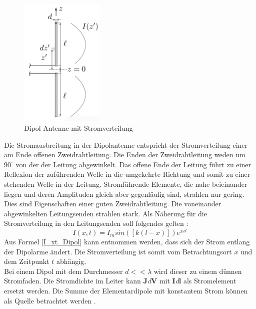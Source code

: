 \begin{figure}[!ht]
	\centering
	\includegraphics[width=4cm]{content/bilder/Dipol_EMANT_S42.pdf}%
	\caption{Dipol Antenne mit Stromverteilung \cite{Tekom}}
	\label{FitzDipol}
\end{figure}
Die Stromausbreitung in der Dipolantenne entspricht der Stromverteilung einer am Ende offenen Zweidrahtleitung. Die Enden der Zweidrahtleitung weden um $90^\circ$  von der der Leitung abgewinkelt. Das offene Ende der Leitung führt zu einer Reflexion der zuführenden Welle in die umgekehrte Richtung und somit zu einer stehenden Welle in der Leitung. Stromführende Elemente, die nahe beieinander liegen und deren Amplituden gleich aber gegenläufig sind, strahlen nur gering. Dies sind Eigenschaften einer guten Zweidrahtleitung. Die voneinander abgewinkelten Leitungsenden strahlen stark.
Als Näherung für die Stromverteilung in den Leitungsenden soll folgendes gelten \cite{elliott1981antenna}:
\begin{equation}\label{I_xt_Dipol} 
I(x,t) =I_{m}sin([k(l-x)])e^{j\omega t}
\end{equation}
Aus Formel \ref{I_xt_Dipol} kann entnommen werden, dass sich der Strom entlang der Dipolarme ändert. Die Stromverteilung ist somit vom Betrachtungsort $x$ und dem Zeitpunkt $t$ abhängig.\\
Bei einem Dipol mit dem Durchmesser $d<<\lambda$ wird dieser zu einem dünnen Stromfaden. Die Stromdichte im Leiter kann \textbf{J}\textit{d}\textbf{\textbf{V}} mit \textbf{I}\textit{d}\textbf{\textbf{l}} als Stromelement ersetzt werden. Die Summe der Elementardipole mit konstantem Strom können als Quelle betrachtet werden \cite{elliott1981antenna}.\\

